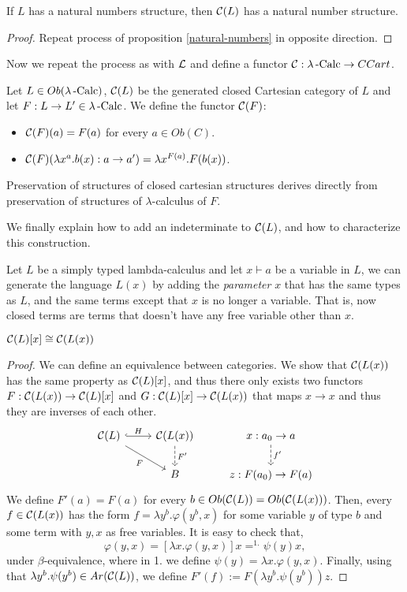 \begin{proposition}
  If $L$ has a natural numbers structure, then $\mathcal{C} (L)$ has a natural number structure.
\end{proposition}
\begin{proof}
  Repeat process of proposition \ref{natural-numbers} in opposite direction.
\end{proof}
Now we repeat the process as with $\mathcal{L}$ and define a functor $\mathcal{C}: \lambda\operatorname{-Calc} \to CCart$.
\begin{definition}
  Let $L\in Ob(\lambda\operatorname{-Calc})$, $\mathcal{C} (L)$ be the generated closed Cartesian category of $L$ and let $F:L\to L'\in \lambda\operatorname{-Calc}$.  We define the functor $\mathcal{C} (F)$:
  \begin{itemize}
  \item $\mathcal{C} (F) (a) = F(a)$ for every $a\in Ob(C)$.
  \item $\mathcal{C} (F) (\lambda x^a. b(x) :a \to a') = \lambda x^{F(a)}. F(b(x))$.
  \end{itemize}
\end{definition}
\begin{remark}
  Preservation of structures of closed cartesian structures derives directly from preservation of structures of $\lambda$-calculus of $F$.
\end{remark}

We finally explain how to add an indeterminate to $\mathcal{C}(L)$, and how to characterize this construction.

\begin{definition}
  Let $L$ be a simply typed lambda-calculus and let $x\vdash a$ be a variable in $L$, we can generate the language $L(x)$ by adding the \emph{parameter} $x$ that has the same types as $L$, and the same terms except that $x$ is no longer a variable. That is, now closed terms are terms that doesn't have any free variable other than $x$.
\end{definition}



\begin{proposition}
  $\mathcal{C}(L)[x] \cong \mathcal{C}(L(x))$
\end{proposition}
\begin{proof}
  We can define an equivalence between categories. We show that $\mathcal{C}(L(x))$ has the same property as $\mathcal{C}(L)[x]$, and thus there only exists two functors $F:\mathcal{C}(L(x))\to \mathcal{C}(L)[x]$  and $G:\mathcal{C}(L)[x] \to\mathcal{C}(L(x))$ that maps $x\to x$ and thus they are inverses of each other.
  \[
  \begin{tikzcd}
    \CC(L)\arrow[hookrightarrow]{r}{H} \arrow[rd, "F", swap]      & \CC(L(x)) \arrow[d, "F'", dashed]& x:a_0\to a\arrow[d,"f'",dashed]\\
    &B& z:F(a_0)\to F(a) 
  \end{tikzcd}
\]
We define $F'(a) = F(a)$ for every $b\in Ob(\mathcal{C}(L))=Ob(\mathcal{C}(L(x)))$. Then,  every $f \in \mathcal{C}(L(x))$ has the form $f = \lambda y^b. \varphi(y^b, x)$ for some variable $y$ of type $b$ and some term with $y,x$ as free variables. It is easy to check that, $$\varphi(y, x) = [\lambda x. \varphi(y,x ) ] x =^{1.} \psi(y)x,$$ under $\beta$-equivalence, where in 1. we define $\psi (y)= \lambda x. \varphi(y,x)$. Finally, using that $\lambda y^b. \psi(y^b) \in Ar(\mathcal{C}(L))$, we define $F'(f):= F(\lambda y^b. \psi(y^b)) z$.
\end{proof}
